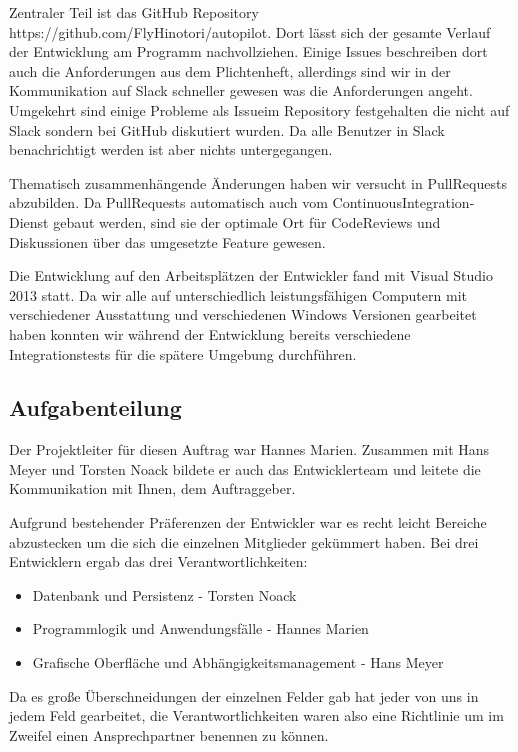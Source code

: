 \documentclass[12pt]{article}
\begin{document}
Zentraler Teil ist das GitHub Repository https://github.com/FlyHinotori/autopilot. Dort lässt sich der gesamte Verlauf der Entwicklung am Programm nachvollziehen. Einige Issues beschreiben dort auch die Anforderungen aus dem Plichtenheft, allerdings sind wir in der Kommunikation auf Slack schneller gewesen was die Anforderungen angeht. Umgekehrt sind einige Probleme als Issueim Repository festgehalten die nicht auf Slack sondern bei GitHub diskutiert wurden. Da alle Benutzer in Slack benachrichtigt werden ist aber nichts untergegangen.
\newline

Thematisch zusammenhängende Änderungen haben wir versucht in PullRequests abzubilden. Da PullRequests automatisch auch vom ContinuousIntegration-Dienst gebaut werden, sind sie der optimale Ort für CodeReviews und Diskussionen über das umgesetzte Feature gewesen.
\newline

Die Entwicklung auf den Arbeitsplätzen der Entwickler fand mit Visual Studio 2013 statt. Da wir alle auf unterschiedlich leistungsfähigen Computern mit verschiedener Ausstattung und verschiedenen Windows Versionen gearbeitet haben konnten wir während der Entwicklung bereits verschiedene Integrationstests für die spätere Umgebung durchführen.

\subsection{Aufgabenteilung}

Der Projektleiter für diesen Auftrag war Hannes Marien. Zusammen mit Hans Meyer und Torsten Noack bildete er auch das Entwicklerteam und leitete die Kommunikation mit Ihnen, dem Auftraggeber.
\newline

Aufgrund bestehender Präferenzen der Entwickler war es recht leicht Bereiche abzustecken um die sich die einzelnen Mitglieder gekümmert haben. Bei drei Entwicklern ergab das drei Verantwortlichkeiten: 

\begin{itemize}
  \item Datenbank und Persistenz - Torsten Noack
  \item Programmlogik und Anwendungsfälle - Hannes Marien
  \item Grafische Oberfläche und Abhängigkeitsmanagement - Hans Meyer
\end{itemize}

Da es große Überschneidungen der einzelnen Felder gab hat jeder von uns in jedem Feld gearbeitet, die Verantwortlichkeiten waren also eine Richtlinie um im Zweifel einen Ansprechpartner benennen zu können.
\newline
\end{document}

